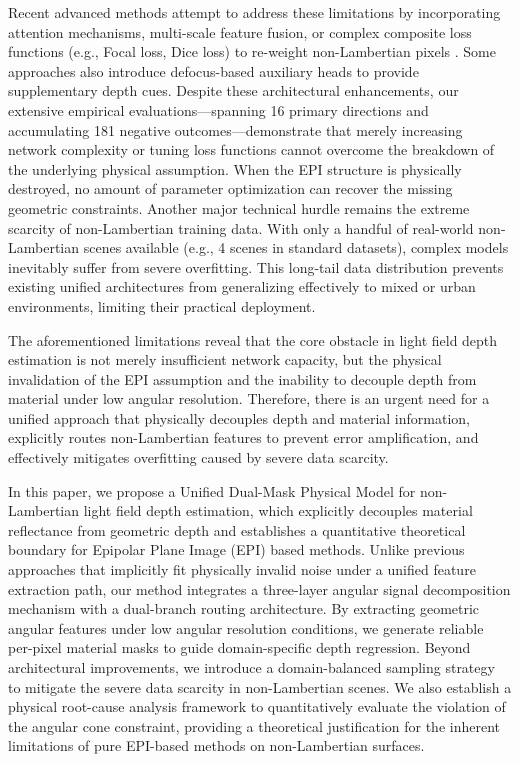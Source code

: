 Recent advanced methods attempt to address these limitations by incorporating attention mechanisms, multi-scale feature fusion, or complex composite loss functions (e.g., Focal loss, Dice loss) to re-weight non-Lambertian pixels . Some approaches also introduce defocus-based auxiliary heads to provide supplementary depth cues. Despite these architectural enhancements, our extensive empirical evaluations—spanning 16 primary directions and accumulating 181 negative outcomes—demonstrate that merely increasing network complexity or tuning loss functions cannot overcome the breakdown of the underlying physical assumption. When the EPI structure is physically destroyed, no amount of parameter optimization can recover the missing geometric constraints. Another major technical hurdle remains the extreme scarcity of non-Lambertian training data. With only a handful of real-world non-Lambertian scenes available (e.g., 4 scenes in standard datasets), complex models inevitably suffer from severe overfitting. This long-tail data distribution prevents existing unified architectures from generalizing effectively to mixed or urban environments, limiting their practical deployment.

The aforementioned limitations reveal that the core obstacle in light field depth estimation is not merely insufficient network capacity, but the physical invalidation of the EPI assumption and the inability to decouple depth from material under low angular resolution. Therefore, there is an urgent need for a unified approach that physically decouples depth and material information, explicitly routes non-Lambertian features to prevent error amplification, and effectively mitigates overfitting caused by severe data scarcity.

In this paper, we propose a Unified Dual-Mask Physical Model for non-Lambertian light field depth estimation, which explicitly decouples material reflectance from geometric depth and establishes a quantitative theoretical boundary for Epipolar Plane Image (EPI) based methods. Unlike previous approaches that implicitly fit physically invalid noise under a unified feature extraction path, our method integrates a three-layer angular signal decomposition mechanism with a dual-branch routing architecture. By extracting geometric angular features under low angular resolution conditions, we generate reliable per-pixel material masks to guide domain-specific depth regression. Beyond architectural improvements, we introduce a domain-balanced sampling strategy to mitigate the severe data scarcity in non-Lambertian scenes. We also establish a physical root-cause analysis framework to quantitatively evaluate the violation of the angular cone constraint, providing a theoretical justification for the inherent limitations of pure EPI-based methods on non-Lambertian surfaces.

